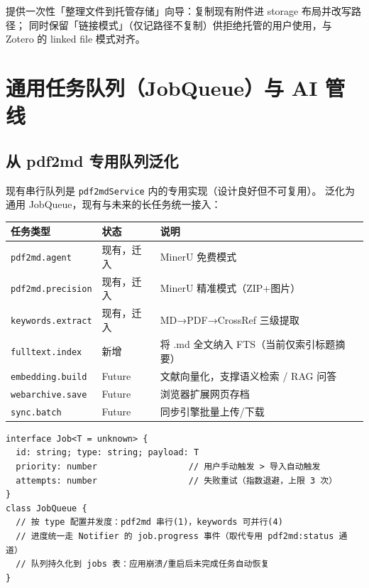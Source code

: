 \documentclass[12pt, a4paper]{article}
\begin{document}
\begin{tcolorbox}[notebox, title={迁移兼容}]
  提供一次性「整理文件到托管存储」向导：复制现有附件进 storage 布局并改写路径；
  同时保留「链接模式」（仅记路径不复制）供拒绝托管的用户使用，与 Zotero 的
  linked file 模式对齐。
\end{tcolorbox}

\section{通用任务队列（JobQueue）与 AI 管线}

\subsection{从 pdf2md 专用队列泛化}

现有串行队列是 \texttt{pdf2mdService} 内的专用实现（设计良好但不可复用）。
泛化为通用 JobQueue，现有与未来的长任务统一接入：

\begin{center}
\begin{tabular}{p{4cm} p{4cm} p{4.5cm}}
  \toprule
  \textbf{任务类型} & \textbf{状态} & \textbf{说明} \\
  \midrule
  \texttt{pdf2md.agent}     & 现有，迁入 & MinerU 免费模式 \\
  \texttt{pdf2md.precision} & 现有，迁入 & MinerU 精准模式（ZIP+图片） \\
  \texttt{keywords.extract} & 现有，迁入 & MD→PDF→CrossRef 三级提取 \\
  \texttt{fulltext.index}   & 新增 & 将 .md 全文纳入 FTS（当前仅索引标题摘要） \\
  \texttt{embedding.build}  & Future & 文献向量化，支撑语义检索 / RAG 问答 \\
  \texttt{webarchive.save}  & Future & 浏览器扩展网页存档 \\
  \texttt{sync.batch}       & Future & 同步引擎批量上传/下载 \\
  \bottomrule
\end{tabular}
\end{center}

\begin{lstlisting}[language={}]
interface Job<T = unknown> {
  id: string; type: string; payload: T
  priority: number                  // 用户手动触发 > 导入自动触发
  attempts: number                  // 失败重试（指数退避，上限 3 次）
}
class JobQueue {
  // 按 type 配置并发度：pdf2md 串行(1)，keywords 可并行(4)
  // 进度统一走 Notifier 的 job.progress 事件（取代专用 pdf2md:status 通道）
  // 队列持久化到 jobs 表：应用崩溃/重启后未完成任务自动恢复
}
\end{lstlisting}
\end{document}
